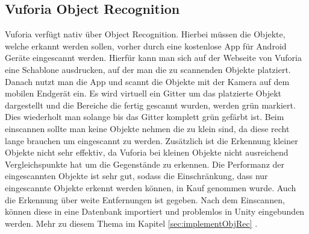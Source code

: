 \subsection{Vuforia Object Recognition}
\label{sec:vufObjRec}
Vuforia verfügt nativ über Object Recognition.\cite{VufObjRec} Hierbei müssen die Objekte, welche erkannt werden sollen, vorher durch eine kostenlose App für Android Geräte eingescannt werden. Hierfür kann man sich auf der Webseite von Vuforia eine Schablone ausdrucken, auf der man die zu scannenden Objekte platziert. Danach nutzt man die App und scannt die Objekte mit der Kamera auf dem mobilen Endgerät ein. Es wird virtuell ein Gitter um das platzierte Objekt dargestellt und die Bereiche die fertig gescannt wurden, werden grün markiert. Dies wiederholt man solange bis das Gitter komplett grün gefärbt ist.  Beim einscannen sollte man keine Objekte nehmen die zu klein sind, da diese recht lange brauchen um eingescannt zu werden. Zusätzlich ist die Erkennung kleiner Objekte nicht sehr effektiv, da Vuforia bei kleinen Objekte nicht ausreichend Vergleichspunkte hat um die Gegenstände zu erkennen. Die Performanz der eingescannten Objekte ist sehr gut, sodass die Einschränkung, dass nur eingescannte Objekte erkennt werden können, in Kauf genommen wurde. Auch die Erkennung über weite Entfernungen ist gegeben. Nach dem Einscannen, können diese in eine Datenbank importiert und problemlos in Unity eingebunden werden. Mehr zu diesem Thema im Kapitel \ref{sec:implementObjRec}  .
